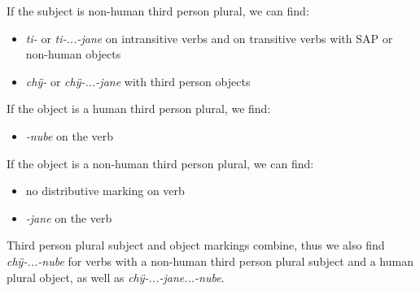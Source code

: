 \ex\upshape
If the subject is non-human third person plural, we can find:
 \begin{itemize}
\item \textit{ti-} or \textit{ti-...-jane} on intransitive verbs and on transitive verbs with SAP or non-human objects
\item \textit{chÿ-} or \textit{chÿ-...-jane} with third person objects
\end{itemize}

\ex\upshape
If the object is a human third person plural, we find:
 \begin{itemize}
\item \textit{-nube} on the verb
\end{itemize}

\ex\upshape
If the object is a non-human third person plural, we can find:
 \begin{itemize}
\item no distributive marking on verb
\item \textit{-jane} on the verb
\end{itemize}

\ex\upshape
Third person plural subject and object markings combine, thus we also find \textit{chÿ-...-nube} for verbs with a non-human third person plural subject and a human plural object, as well as \textit{chÿ-...-jane...-nube}.

%
\z
\xe



